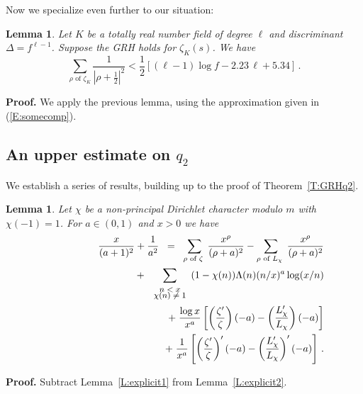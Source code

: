 \documentclass{amsart}
\newtheorem{lemma}[theorem]{Lemma}
\numberwithin{equation}{section}
\numberwithin{table}{section}
\begin{document}
\vspace{1ex}

Now we specialize even further to our situation:
\begin{lemma}\label{L:rzerosbound}
Let $K$ be a totally real number field of degree $\ell$ and discriminant $\Delta=f^{\ell-1}$.
Suppose the GRH holds for $\zeta_K(s)$.
We have
$$
  \sum_{\rho\text{ of $\zeta_K$}}
  \frac{1}{\left|\rho+\frac{1}{2}\right|^2}
<
  
  \frac{1}{2}
  \left[
  (\ell-1)\log f-
  2.23\,\ell
  +5.34
  \right]
  \,.
$$
\end{lemma}

\noindent\textbf{Proof.}
We apply the previous lemma, using the approximation
given in (\ref{E:somecomp}).
{\raisebox{-.25ex}{\scalebox{.786}[1.272]{$\blacksquare$}}}

\subsection{An upper estimate on $q_2$}\label{S:GRH.nonresidues.q2}

We establish a series of results, building up to the proof of Theorem~\ref{T:GRHq2}.

\begin{lemma}\label{L:q2lemma1}
Let $\chi$ be a non-principal Dirichlet character modulo $m$ with \mbox{$\chi(-1)=1$}.
For $a\in(0,1)$ and $x>0$ we have
\begin{eqnarray*}
&&
\frac{x}{(a+1)^2}
+
\frac{1}{a^2}
 \;\;=\;\;
  \sum_{\rho\text{ of $\zeta$ }}
   \frac{x^\rho}{(\rho+a)^2}
  -
   \sum_{\rho\text{ of $L_\chi$ }}
 \frac{x^\rho}{(\rho+a)^2}
 \\ 
 &&\qquad\qquad\qquad\qquad
  \;+\;
    \sum_{\footnotesize{\begin{array}{cc}n<x\\[-1ex]\chi(n)\neq 1\end{array}}}
    (1-\chi(n))
 \Lambda(n)
 (n/x)^a
 \log(x/n) 
 \\ 
 &&\qquad\qquad\qquad\qquad
  \;+\;
 \frac{\log x}{x^a}
  \left[
  \left(\frac{\zeta'}{\zeta}\right)(-a)
  -
 \left(\frac{L_{\chi}'}{L_{\chi}}\right)(-a)
 \right]
 \\
 &&\qquad\qquad\qquad\qquad
 \;+\;
 \frac{1}{x^a}
 \left[
  \left(\frac{\zeta'}{\zeta}\right)'(-a)
  -
 \left(
 \frac{L_{\chi}'}{L_{\chi}}
 \right)'
 (-a)
 \right]
 \,.
\end{eqnarray*}
\end{lemma}

\noindent\textbf{Proof.}
Subtract Lemma~\ref{L:explicit1} from Lemma~\ref{L:explicit2}.
{\raisebox{-.25ex}{\scalebox{.786}[1.272]{$\blacksquare$}}}
\end{document}
